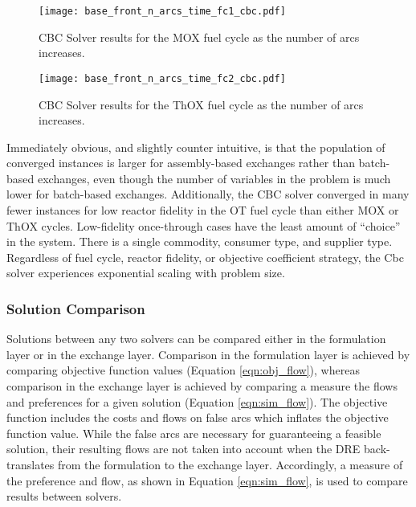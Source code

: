 \begin{figure}[h!]
  \begin{center}
    \texttt{[image: base\_front\_n\_arcs\_time\_fc1\_cbc.pdf]}
    \caption{
      \label{fig:base_front_n_arcs_time_fc1_cbc}
      CBC Solver results for the MOX fuel cycle as the number of arcs
      increases.
      }
  \end{center}
\end{figure}

\begin{figure}[h!]
  \begin{center}
    \texttt{[image: base\_front\_n\_arcs\_time\_fc2\_cbc.pdf]}
    \caption{
      \label{fig:base_front_n_arcs_time_fc2_cbc}
      CBC Solver results for the ThOX fuel cycle as the number of arcs
      increases.
      }
  \end{center}
\end{figure}

Immediately obvious, and slightly counter intuitive, is that the population of
converged instances is larger for assembly-based exchanges rather than
batch-based exchanges, even though the number of variables in the problem is
much lower for batch-based exchanges. Additionally, the CBC solver converged in
many fewer instances for low reactor fidelity in the OT fuel cycle than either
MOX or ThOX cycles. Low-fidelity once-through cases have the least amount of
``choice'' in the system. There is a single commodity, consumer type, and
supplier type. Regardless of fuel cycle, reactor fidelity, or objective
coefficient strategy, the Cbc solver experiences exponential scaling with
problem size.

\subsubsection{Solution Comparison}\label{sec:res:scale:front:soln}

Solutions between any two solvers can be compared either in the formulation
layer or in the exchange layer. Comparison in the formulation layer is achieved
by comparing objective function values (Equation \ref{eqn:obj_flow}), whereas
comparison in the exchange layer is achieved by comparing a measure the flows
and preferences for a given solution (Equation \ref{eqn:sim_flow}). The
objective function includes the costs and flows on false arcs which inflates the
objective function value. While the false arcs are necessary for guaranteeing a
feasible solution, their resulting flows are not taken into account when the DRE
back-translates from the formulation to the exchange layer. Accordingly, a
measure of the preference and flow, as shown in Equation \ref{eqn:sim_flow}, is
used to compare results between solvers.

